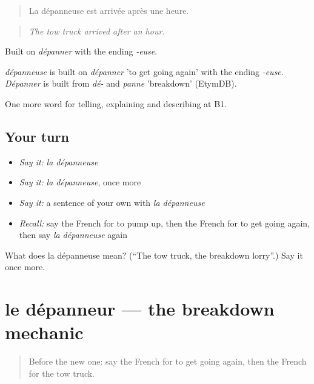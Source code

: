 \begin{quote}
La dépanneuse est arrivée après une heure.
\end{quote}

\begin{quote}
\emph{The tow truck arrived after an hour.}
\end{quote}

Built on \emph{dépanner} with the ending \emph{-euse}.

\begin{cousinweb}
\emph{dépanneuse} is built on \emph{dépanner} 'to get going again' with the ending \emph{-euse}. \emph{Dépanner} is built from \emph{dé-} and \emph{panne} 'breakdown' (EtymDB).
\end{cousinweb}

\begin{grammarlens}[title={What you've built}]
One more word for telling, explaining and describing at B1.
\end{grammarlens}

\subsection*{Your turn}
\begin{itemize}
\raggedright
  \item \emph{Say it:} \emph{la dépanneuse}
  \item \emph{Say it:} \emph{la dépanneuse}, once more
  \item \emph{Say it:} a sentence of your own with \emph{la dépanneuse}
  \item \emph{Recall:} say the French for to pump up, then the French for to get going again, then say \emph{la dépanneuse} again
\end{itemize}

\begin{tcolorbox}[breakable,colback=teal!4,colframe=teal!35!black,title={Before you move on}]
What does la dépanneuse mean? (\textquotedblleft{}The tow truck, the breakdown lorry\textquotedblright{}.) Say it once more.
\end{tcolorbox}
\section[le dépanneur]{le dépanneur — the breakdown mechanic}

\label{lesson:FR-C405-depanneur}



\begin{quote}
Before the new one: say the French for to get going again, then the French for the tow truck.
\end{quote}

